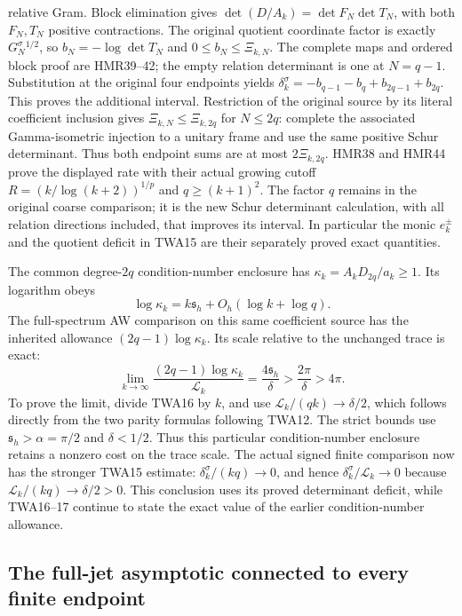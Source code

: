 relative Gram. Block elimination gives
$\det(D/A_k)=\det F_N\det T_N$, with both $F_N,T_N$
positive contractions. The original quotient coordinate
factor is exactly $G_N^\sigma{}^{1/2}$, so
$b_N=-\log\det T_N$ and
$0\leq b_N\leq\Xi_{k,N}$. The complete maps and ordered
block proof are HMR39--42; the empty relation determinant
is one at $N=q-1$.
Substitution at the original four endpoints yields
$\delta_k^\sigma=-b_{q-1}-b_q+b_{2q-1}+b_{2q}$.
This proves the additional interval.
Restriction of the original source by its literal coefficient
inclusion gives $\Xi_{k,N}\leq\Xi_{k,2q}$ for $N\leq2q$:
complete the associated Gamma-isometric injection to a
unitary frame and use the same positive Schur determinant.
Thus both endpoint sums are at most $2\Xi_{k,2q}$.
HMR38 and HMR44 prove the displayed rate with their actual
growing cutoff $R=(k/\log(k+2))^{1/p}$ and $q\geq(k+1)^2$.
The factor $q$ remains in the original coarse comparison;
it is the new Schur determinant calculation, with all
relation directions included, that improves its interval.
In particular the monic $e_k^\pm$ and the quotient deficit
in TWA15 are their separately proved exact quantities.

The common degree-$2q$ condition-number enclosure has
$\kappa_k=A_kD_{2q}/a_k\ge1$. Its logarithm obeys
\[
\log\kappa_k=k\mathfrak s_h+O_h(\log k+\log q).
\tag{TWA16}
\]
The full-spectrum AW comparison on this same coefficient source
has the inherited allowance $(2q-1)\log\kappa_k$. Its scale
relative to the unchanged trace is exact:
\[
\lim_{k\to\infty}\frac{(2q-1)\log\kappa_k}{\mathcal L_k}
=\frac{4\mathfrak s_h}{\delta}
>\frac{2\pi}{\delta}>4\pi.
\tag{TWA17}
\]
To prove the limit, divide TWA16 by $k$, and use
$\mathcal L_k/(qk)\to\delta/2$, which follows directly from
the two parity formulas following TWA12. The strict bounds use
$\mathfrak s_h>\alpha=\pi/2$ and $\delta<1/2$.
Thus this particular condition-number enclosure retains a
nonzero cost on the trace scale. The actual signed finite
comparison now has the stronger TWA15 estimate:
$\delta_k^\sigma/(kq)\to0$, and hence
$\delta_k^\sigma/\mathcal L_k\to0$ because
$\mathcal L_k/(kq)\to\delta/2>0$.
This conclusion uses its proved determinant deficit,
while TWA16--17 continue to state the exact value of the
earlier condition-number allowance.

\subsection{The full-jet asymptotic connected to every finite endpoint}

